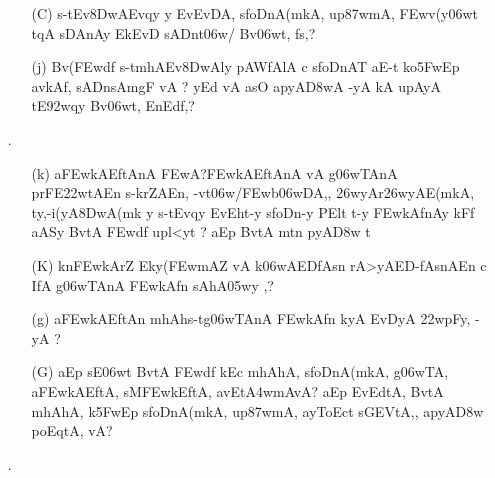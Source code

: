 \begin{itemize} 
\item[]		 \begin{itemize}         
          \item[({\dn C})] {\dn s\2-tEv\38DwAEvqy\? y\? EvEvDA, s\2foDnA(mkA, up\387wmA, \3FEwv(y\0\306wt\?{\rs ,\re} t\?qA\2 s\2DAnAy Ek\2EvD\2 sADnt\306w/\2 Bv\306wt, f\2s\?,{\rs ?\re}}
          
          \item[({\dn j})] {\dn Bv(\3FEwd\?f\? s\2-tmhAEv\38DwAly\? pAWfAlA c s\2foDnAT\0 aE-t ko\35FwEp avkAf, sADnsAmg\5F vA {\rs ?\re} yEd vA asO apyA\0\3D8wA -yA kA upAyA tE\392wqy\? Bv\306wt, EnEd\0f\?,{\rs ?\re}}
          
         \end{itemize}


\item[{\dn \dnnum \rn{24}}.] \begin{itemize}
           
          \item[({\dn k})] {\dn a\3FEwkAEftAnA\2 \3FEwA?\3FEwkAEftAnA\2 vA g\5\306wTAnA\2 prFE\322w\-tAEn s\2-krZAEn{\rs ,\re} -vt\306w/\3FEwb\306wDA,{\rs ,\re} \326wyAr\326wyAE(mkA, ty,{\rs -\re}i(yA\38DwA(mk\2 y s\2-tEvqy\? EvEht-y s\2foDn-y PElt t-y \3FEwkAfnAy kFf aASy\2 BvtA\2 \3FEwd\?f\? upl<yt\? {\rs ?\re} aEp BvtA\2 mt\?n pyA\0\3D8w\2 t} 
           
          \item[({\dn K})] {\dn k\?n\3FEwkAr\?Z Eky(\3FEwmAZ\2 vA k\?\306wAEDfAsn\2 rA>yAED{\rs -\re}\-fAsnAEn c IfA\2 g\5\306wTAnA\2 \3FEwkAfn\? sAhA\305wy\2 \0,{\rs ?\re}} 
          
          \item[({\dn g})] {\dn a\3FEwkAEftAn\2 mhAh\0s\2-tg\5\306wTAnA\2 \3FEwkAfn\2 kyA EvDyA \322w\?pFy, -yA {\rs ?\re} }
          
          \item[({\dn G})] {\dn aEp sE\306wt BvtA\2 \3FEwd\?f\? k\?Ec mhAhA\0, s\2foDnA(mkA, g\5\306wTA, a\3FEwkAEftA, sM\3FEwkEftA, avEt\3A4wmAvA{\rs ?\re} aEp EvEdtA, BvtA\2 mhAhA\0, k\?\35FwEp s\2foDnA(mkA, up\387wmA, ayToEct\2 s\2GEVtA,{\rs ,\re} apyA\0\3D8w\2 poEqtA, vA{\rs ?\re}}
          \end{itemize}

\item[{\dn \dnnum \rn{25}}.] \begin{itemize}
               

\end{itemize}
\end{itemize}
